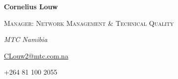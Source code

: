 \documentclass[
  letterpaper,
  DIV=11,
  numbers=noendperiod]{scrartcl}
\begin{document}
\vspace{5pt}

\begin{large}
  \begin{multicols}{2}
    \begin{flushleft}\textbf{Cornelius Louw}\end{flushleft}
  \end{multicols}
  \vspace{-0.17cm}
  \begin{multicols}{2}
    \begin{flushleft}\textsc{Manager: Network Management \& Technical Quality}\end{flushleft}
  \end{multicols}
  \vspace{-0.17cm}
  \begin{multicols}{2}
    \begin{flushleft}\textit{MTC Namibia}\end{flushleft}
  \end{multicols}
  \vspace{-0.17cm}
  \begin{multicols}{2}
    \begin{flushleft}\href{mailto:CLouw2@mtc.com.na}{CLouw2@mtc.com.na}\end{flushleft}
  \end{multicols}
  \vspace{-0.17cm}
  \begin{multicols}{2}
    \begin{flushleft}{+264 81 100 2055}\end{flushleft}
  \end{multicols}
\end{large}

\vspace{5pt}
\end{document}
